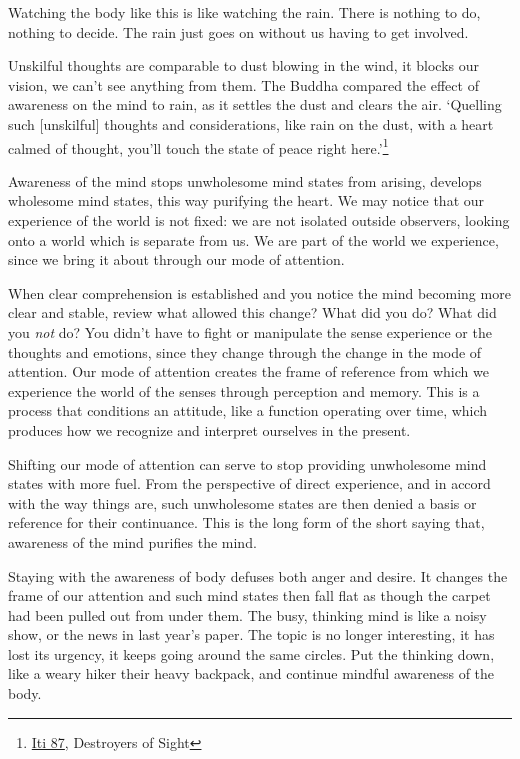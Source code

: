 \enlargethispage*{\baselineskip}

Watching the body like this is like watching the rain. There is nothing
to do, nothing to decide. The rain just goes on without us having to get
involved.

\clearpage


Unskilful thoughts are comparable to dust blowing in the wind, it blocks
our vision, we can't see anything from them. The Buddha compared the
effect of awareness on the mind to rain, as it settles the dust and
clears the air. `Quelling such {[}unskilful{]} thoughts and
considerations, like rain on the dust, with a heart calmed of thought,
you'll touch the state of peace right here.'\footnote{\href{https://suttacentral.net/iti87/en/sujato}{Iti
  87}, Destroyers of Sight}

Awareness of the mind stops unwholesome mind states from arising,
develops wholesome mind states, this way purifying the heart. We may
notice that our experience of the world is not fixed: we are not
isolated outside observers, looking onto a world which is separate from
us. We are part of the world we experience, since we bring it about
through our mode of attention.

When clear comprehension is established and you notice the mind becoming
more clear and stable, review what allowed this change? What did you do?
What did you \emph{not} do? You didn't have to fight or manipulate the
sense experience or the thoughts and emotions, since they change through
the change in the mode of attention. Our mode of attention creates the
frame of reference from which we experience the world of the senses
through perception and memory. This is a process that conditions an
attitude, like a function operating over time, which produces how we
recognize and interpret ourselves in the present.

Shifting our mode of attention can serve to stop providing unwholesome
mind states with more fuel. From the perspective of direct experience,
and in accord with the way things are, such unwholesome states are then
denied a basis or reference for their continuance. This is the long form
of the short saying that, awareness of the mind purifies the mind.

Staying with the awareness of body defuses both anger and desire. It
changes the frame of our attention and such mind states then fall flat
as though the carpet had been pulled out from under them. The busy,
thinking mind is like a noisy show, or the news in last year's paper.
The topic is no longer interesting, it has lost its urgency, it keeps
going around the same circles. Put the thinking down, like a weary hiker
their heavy backpack, and continue mindful awareness of the body.

